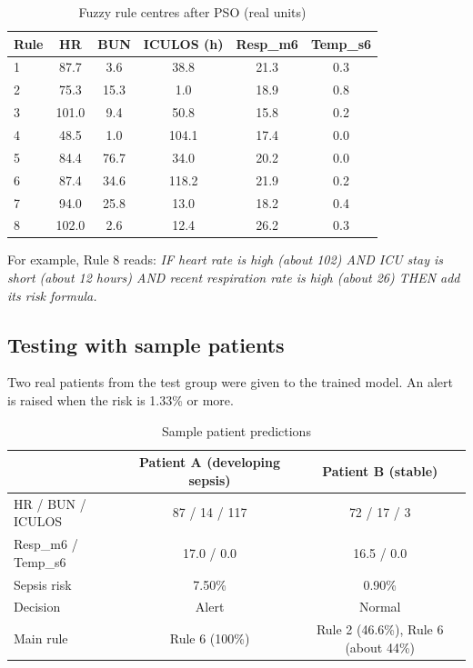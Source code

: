 \documentclass[11pt,a4paper]{article}
\begin{document}
\begin{table}[H]
\centering\small
\caption{Fuzzy rule centres after PSO (real units)}\label{tab:rules}
\begin{tabular}{@{}lccccc@{}}
\toprule
\textbf{Rule} & \textbf{HR} & \textbf{BUN} & \textbf{ICULOS (h)} & \textbf{Resp\_m6} & \textbf{Temp\_s6}\\\midrule
1 & 87.7 & 3.6 & 38.8 & 21.3 & 0.3\\
2 & 75.3 & 15.3 & 1.0 & 18.9 & 0.8\\
3 & 101.0 & 9.4 & 50.8 & 15.8 & 0.2\\
4 & 48.5 & 1.0 & 104.1 & 17.4 & 0.0\\
5 & 84.4 & 76.7 & 34.0 & 20.2 & 0.0\\
6 & 87.4 & 34.6 & 118.2 & 21.9 & 0.2\\
7 & 94.0 & 25.8 & 13.0 & 18.2 & 0.4\\
8 & 102.0 & 2.6 & 12.4 & 26.2 & 0.3\\\bottomrule
\end{tabular}
\end{table}

For example, Rule 8 reads: \emph{IF heart rate is high (about 102) AND ICU stay is short (about 12 hours) AND recent respiration rate is high (about 26) THEN add its risk formula.}

\subsection{Testing with sample patients}
Two real patients from the test group were given to the trained model. An alert is raised when the risk is 1.33\% or more.

\begin{table}[H]
\centering\small
\caption{Sample patient predictions}
\begin{tabular}{@{}lcc@{}}
\toprule
 & \textbf{Patient A (developing sepsis)} & \textbf{Patient B (stable)}\\\midrule
HR / BUN / ICULOS & 87 / 14 / 117 & 72 / 17 / 3\\
Resp\_m6 / Temp\_s6 & 17.0 / 0.0 & 16.5 / 0.0\\
Sepsis risk & 7.50\% & 0.90\%\\
Decision & Alert & Normal\\
Main rule & Rule 6 (100\%) & Rule 2 (46.6\%), Rule 6 (about 44\%)\\\bottomrule
\end{tabular}
\end{table}
\end{document}
